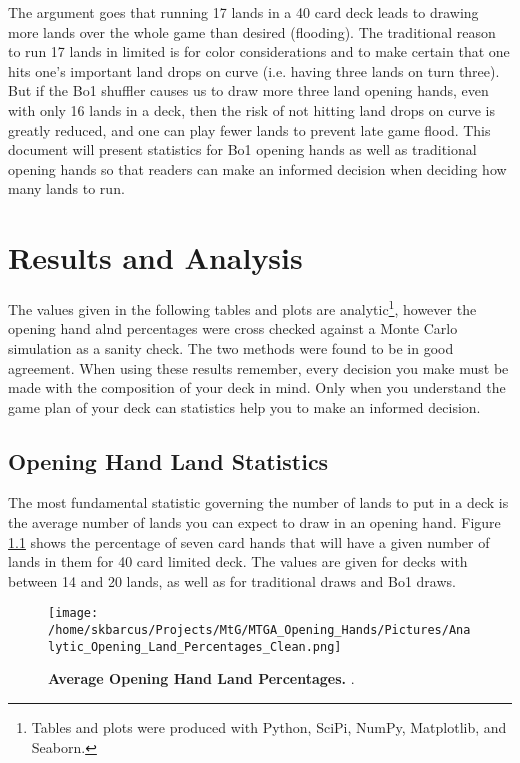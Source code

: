 \documentclass[oneside]{book}   %
\begin{document}
The argument goes that running 17 lands in a 40 card deck leads to drawing more lands over the whole game than desired (flooding). The traditional reason to run 17 lands in limited is for color considerations and to make certain that one hits one's important land drops on curve (i.e. having three lands on turn three). But if the Bo1 shuffler causes us to draw more three land opening hands, even with only 16 lands in a deck, then the risk of not hitting land drops on curve is greatly reduced, and one can play fewer lands to prevent late game flood. This document will present statistics for Bo1 opening hands as well as traditional opening hands so that readers can make an informed decision when deciding how many lands to run.

\chapter{Results and Analysis}
\label{results}

The values given in the following tables and plots are analytic\footnote{Tables and plots were produced with Python, SciPi, NumPy, Matplotlib, and Seaborn.}, however the opening hand alnd percentages were cross checked against a Monte Carlo simulation as a sanity check. The two methods were found to be in good agreement. When using these results remember, every decision you make must be made with the composition of your deck in mind. Only when you understand the game plan of your deck can statistics help you to make an informed decision.

\section{Opening Hand Land Statistics}
\label{opener}

The most fundamental statistic governing the number of lands to put in a deck is the average number of lands you can expect to draw in an opening hand. Figure \ref{fig:opening_hand_percentages} shows the percentage of seven card hands that will have a given number of lands in them for 40 card limited deck. The values are given for decks with between 14 and 20 lands, as well as for traditional draws and Bo1 draws.  

	\begin{figure}[!ht]
	\centering
	\centerline{\texttt{[image: /home/skbarcus/Projects/MtG/MTGA\_Opening\_Hands/Pictures/Analytic\_Opening\_Land\_Percentages\_Clean.png]}}
	\caption{
	{\bf{Average Opening Hand Land Percentages.}} .}
	\label{fig:opening_hand_percentages}
	\end{figure}	



\end{document}

